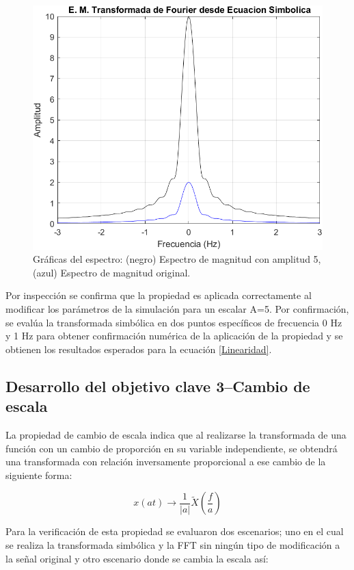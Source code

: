 \documentclass[11pt,letterpaper,twocolumn]{article}
\begin{document}
        \begin{figure}[H]
            \centering 
            \includegraphics[width=0.5\linewidth]{img/Proplinearidad.png}
            \caption{Gráficas del espectro: (negro)  
                     Espectro de magnitud con amplitud 5, (azul) Espectro de magnitud original.}
             \label{P1}
        \end{figure}
        \vspace{-5mm}    
            
        Por inspección se confirma que la propiedad es aplicada correctamente al modificar los parámetros de la simulación para un escalar A=5. Por confirmación, se evalúa la transformada simbólica en dos puntos específicos de frecuencia 0 Hz y 1 Hz para obtener confirmación numérica de la aplicación de la propiedad y se obtienen los resultados esperados para la ecuación \ref{Linearidad}.
        
    \subsection{Desarrollo del objetivo clave 3--Cambio de escala}
        La propiedad de cambio de escala indica que al realizarse la transformada de una función con un cambio de proporción en su variable independiente, se obtendrá una transformada con relación inversamente proporcional a ese cambio de la siguiente forma: 
        
        \begin{equation}
            x(at)\rightarrow \frac{1}{\left | a \right |} \tilde X(\frac{f}{a})
            \label{Escala}
        \end{equation}
         
        Para la verificación de esta propiedad se evaluaron dos escenarios; uno en el cual se realiza la transformada simbólica y la FFT sin ningún tipo de modificación a la señal original y otro escenario donde se cambia la escala así:
        
\end{document}

